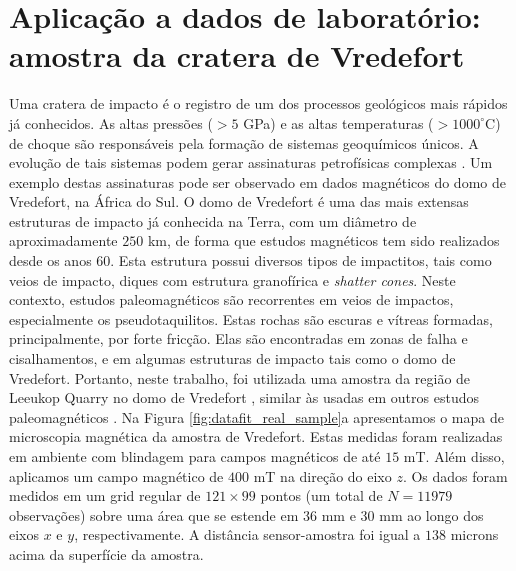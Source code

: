 \chapter{Aplicação a dados de laboratório: amostra da cratera de Vredefort}
\label{sec:lab_application}

Uma cratera de impacto é o registro de um dos processos geológicos mais rápidos já conhecidos. As altas pressões ($> 5$ GPa) e as altas temperaturas ($> 1000^\circ$C) de choque são responsáveis pela formação de sistemas geoquímicos únicos. A evolução de tais sistemas podem gerar assinaturas petrofísicas complexas \citep{pilkington_grieve_1992,pilkington_hildebrand_2003,yokoyama_etal_2015}. Um exemplo destas assinaturas pode ser observado em dados magnéticos do domo de Vredefort, na África do Sul. O domo de Vredefort é uma das mais extensas estruturas de impacto já conhecida na Terra, com um diâmetro de aproximadamente $250$ km, de forma que estudos magnéticos tem sido realizados desde os anos 60. Esta estrutura possui diversos tipos de impactitos, tais como veios de impacto, diques com estrutura granofírica e \textit{shatter cones}. Neste contexto, estudos paleomagnéticos são recorrentes em veios de impactos, especialmente os pseudotaquilitos. Estas rochas são escuras e vítreas formadas, principalmente, por forte fricção. Elas são encontradas em zonas de falha e cisalhamentos, e em algumas estruturas de impacto tais como o domo de Vredefort. Portanto, neste trabalho, foi utilizada uma amostra da região de Leeukop Quarry no domo de Vredefort \citep{araujo_etal2019_materials}, similar às usadas em outros estudos paleomagnéticos \citep{passchier_1982,lana_etal_2003,dressler_reimold_2004,carporzen_etal_2005,araujo_etal2019_sensors}. Na Figura \ref{fig:datafit_real_sample}a apresentamos o mapa de microscopia magnética da amostra de Vredefort. Estas medidas foram realizadas em ambiente com blindagem para campos magnéticos de até $15$ mT. Além disso, aplicamos um campo magnético de $400$ mT na direção do eixo $z$. Os dados foram medidos em um grid regular de $121 \times 99$ pontos (um total de $N=11979$ observações) sobre uma área que se estende em $36$ mm e $30$ mm ao longo dos eixos $x$ e $y$, respectivamente. A distância sensor-amostra foi igual a $138$ microns acima da superfície da amostra. 


